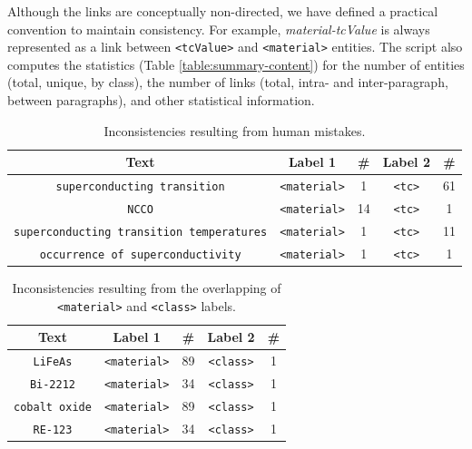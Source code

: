 Although the links are conceptually non-directed, we have defined a practical convention to maintain consistency. For example, \textit{material-tcValue} is always represented as a link between \texttt{<tcValue>} and \texttt{<material>} entities. 
The script also computes the statistics (Table \ref{table:summary-content}) for the number of entities (total, unique, by class), the number of links (total, intra- and inter-paragraph, between paragraphs), and other statistical information. 

\begin{table}[htbp]
    \centering\small
    \caption{Inconsistencies resulting from human mistakes.}
     
    \begin{tabular}{ ccccc } 
    \toprule
        Text & Label 1 & \# & Label 2 & \#\\
    \midrule
        \texttt{superconducting transition}     &   \texttt{<material>}   &    1   &   \texttt{<tc>}  &   61   \\
        \texttt{NCCO}    &	\texttt{<material>}   &    14   &   \texttt{<tc>}  &   1   \\
        \texttt{superconducting transition temperatures}     &   \texttt{<material>}   &    1   &   \texttt{<tc>}  &   11   \\
        \texttt{occurrence of superconductivity}    &	\texttt{<material>}   &    1   &   \texttt{<tc>}  &   1   \\
    \bottomrule
    \end{tabular}
    \label{table:dataset-inconsistencies-unclear}
\end{table}

\begin{table}[htbp]
    \centering\small
    \caption{Inconsistencies resulting from the overlapping of \texttt{<material>} and \texttt{<class>} labels.}
    \begin{tabular}{ ccccc } 
    \toprule
        Text & Label 1 & \# & Label 2 & \#\\
    \midrule
        \texttt{LiFeAs}         &   \texttt{<material>}   &    89   &   \texttt{<class>}  &   1   \\
        \texttt{Bi-2212}        &	\texttt{<material>}   &    34   &   \texttt{<class>}  &   1   \\
        \texttt{cobalt oxide}   &   \texttt{<material>}   &    89   &   \texttt{<class>}  &   1   \\
        \texttt{RE-123}         &	\texttt{<material>}   &    34   &   \texttt{<class>}  &   1   \\
    \bottomrule
    \end{tabular}
    \label{table:dataset-inconsistencies-clear}
\end{table}




